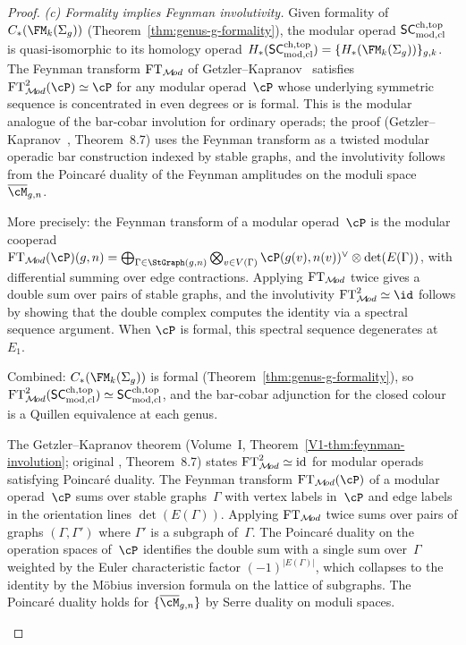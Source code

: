 \begin{proof}
\medskip
\emph{(c) Formality implies Feynman involutivity.}
Given formality of $C_\ast(\FM_k(\Sigma_g))$
(Theorem~\ref{thm:genus-g-formality}), the modular operad
$\mathsf{SC}^{\mathrm{ch,top}}_{\mathrm{mod,cl}}$ is quasi-isomorphic to its homology operad
$H_\ast(\SCmodcl) = \{H_\ast(\FM_k(\Sigma_g))\}_{g,k}$.
The Feynman transform $\mathrm{FT}_{\mathcal{M}\!od}$ of
Getzler--Kapranov~\cite{GK98} satisfies
$\FTmod^2(\cP) \simeq \cP$ for any modular operad~$\cP$ whose
underlying symmetric sequence is concentrated in even
degrees or is formal. This is the modular analogue
of the bar-cobar involution for ordinary operads;
the proof (Getzler--Kapranov~\cite{GK98}, Theorem~8.7)
uses the Feynman transform as a twisted modular operadic
bar construction indexed by stable graphs, and the involutivity
follows from the Poincar\'e duality of the Feynman amplitudes
on the moduli space~$\overline{\cM}_{g,n}$.

More precisely: the Feynman transform of a modular operad~$\cP$
is the modular cooperad
$\FTmod(\cP)(g,n)
= \bigoplus_{\Gamma \in \StGraph(g,n)}
 \bigotimes_{v \in V(\Gamma)}
 \cP(g(v), n(v))^{\vee} \otimes \det(E(\Gamma))$,
with differential summing over edge contractions.
Applying $\mathrm{FT}_{\mathcal{M}\!od}$ twice gives a double sum over pairs of stable
graphs, and the involutivity $\FTmod^2 \simeq \id$ follows by
showing that the double complex computes the identity via a
spectral sequence argument. When $\cP$ is formal, this
spectral sequence degenerates at~$E_1$.

Combined: $C_\ast(\FM_k(\Sigma_g))$ is formal
(Theorem~\ref{thm:genus-g-formality}),
so $\mathrm{FT}_{\mathcal{M}\!od}^2(\mathsf{SC}^{\mathrm{ch,top}}_{\mathrm{mod,cl}}) \simeq \mathsf{SC}^{\mathrm{ch,top}}_{\mathrm{mod,cl}}$, and the
bar-cobar adjunction for the closed colour is a Quillen
equivalence at each genus.

\begin{remark}
\label{rem:feynman-involutivity-sketch}
The Getzler--Kapranov theorem (Volume~I,
Theorem~\ref*{V1-thm:feynman-involution}; original
\cite{GK98}, Theorem~8.7) states
$\mathrm{FT}_{\mathcal{M}\!od}^2 \simeq \mathrm{id}$ for modular operads satisfying
Poincar\'e duality. The Feynman transform
$\FTmod(\cP)$ of a modular operad~$\cP$ sums over stable
graphs~$\Gamma$ with vertex labels in~$\cP$ and edge labels
in the orientation lines $\det(E(\Gamma))$. Applying $\mathrm{FT}_{\mathcal{M}\!od}$
twice sums over pairs of graphs $(\Gamma, \Gamma')$ where
$\Gamma'$ is a subgraph of~$\Gamma$. The Poincar\'e duality
on the operation spaces of~$\cP$ identifies the double sum with
a single sum over~$\Gamma$ weighted by the Euler characteristic
factor $(-1)^{|E(\Gamma)|}$, which collapses to the identity by
the M\"obius inversion formula on the lattice of subgraphs.
The Poincar\'e duality holds for
$\{\overline{\cM}_{g,n}\}$ by Serre duality on moduli spaces.
\end{remark}


\end{proof}
